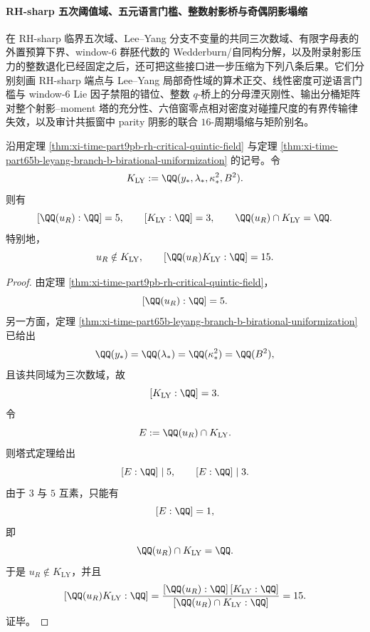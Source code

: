 \paragraph{RH-sharp 五次阈值域、五元语言门槛、整数射影桥与奇偶阴影塌缩}
在 RH-sharp 临界五次域、Lee--Yang 分支不变量的共同三次数域、有限字母表的外置预算下界、window-\(6\) 群胚代数的 Wedderburn/自同构分解，以及附录射影压力的整数退化已经固定之后，还可把这些接口进一步压缩为下列八条后果。它们分别刻画 RH-sharp 端点与 Lee--Yang 局部奇性域的算术正交、线性密度可逆语言门槛与 window-\(6\) Lie 因子禁阻的错位、整数 \(q\)-桥上的分母湮灭刚性、输出分桶矩阵对整个射影--moment 塔的充分性、六倍窗零点相对密度对碰撞尺度的有界传输律失效，以及审计共振窗中 parity 阴影的联合 \(16\)-周期塌缩与矩阶别名。

\begin{theorem}\label{thm:xi-time-part9zj-rhsharp-leyang-localfield-arithmetic-orthogonality}
沿用定理 \ref{thm:xi-time-part9pb-rh-critical-quintic-field} 与定理 \ref{thm:xi-time-part65b-leyang-branch-b-birational-uniformization} 的记号。令
\[
K_{\mathrm{LY}}:=\QQ(y_*,\lambda_*,\kappa_*^2,B^2).
\]
则有
\[
[\QQ(u_R):\QQ]=5,
\qquad
[K_{\mathrm{LY}}:\QQ]=3,
\qquad
\QQ(u_R)\cap K_{\mathrm{LY}}=\QQ.
\]
特别地，
\[
u_R\notin K_{\mathrm{LY}},
\qquad
[\QQ(u_R)K_{\mathrm{LY}}:\QQ]=15.
\]
\end{theorem}
\begin{proof}
由定理 \ref{thm:xi-time-part9pb-rh-critical-quintic-field}，
\[
[\QQ(u_R):\QQ]=5.
\]
另一方面，定理 \ref{thm:xi-time-part65b-leyang-branch-b-birational-uniformization} 已给出
\[
\QQ(y_*)=\QQ(\lambda_*)=\QQ(\kappa_*^2)=\QQ(B^2),
\]
且该共同域为三次数域，故
\[
[K_{\mathrm{LY}}:\QQ]=3.
\]
令
\[
E:=\QQ(u_R)\cap K_{\mathrm{LY}}.
\]
则塔式定理给出
\[
[E:\QQ]\mid 5,
\qquad
[E:\QQ]\mid 3.
\]
由于 \(3\) 与 \(5\) 互素，只能有
\[
[E:\QQ]=1,
\]
即
\[
\QQ(u_R)\cap K_{\mathrm{LY}}=\QQ.
\]
于是 \(u_R\notin K_{\mathrm{LY}}\)，并且
\[
[\QQ(u_R)K_{\mathrm{LY}}:\QQ]
=
\frac{[\QQ(u_R):\QQ]\,[K_{\mathrm{LY}}:\QQ]}
{[\QQ(u_R)\cap K_{\mathrm{LY}}:\QQ]}
=15.
\]
证毕。
\end{proof}

